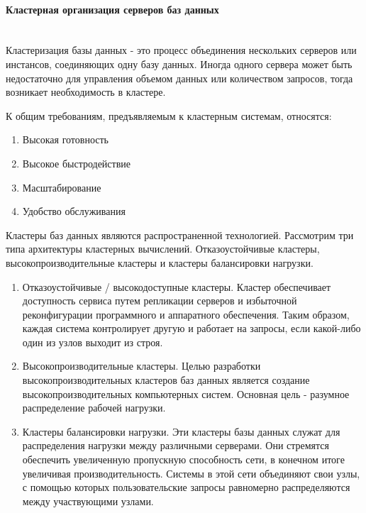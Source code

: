 \paragraph{Кластерная организация серверов баз данных}~\\

Кластеризация базы данных - это процесс объединения нескольких серверов или инстансов, соединяющих одну базу данных. Иногда одного сервера может быть недостаточно для управления объемом данных или количеством запросов, тогда возникает необходимость в кластере. 
 
К общим требованиям, предъявляемым к кластерным системам, относятся:
\begin{enumerate}
    \item Высокая готовность
    \item Высокое быстродействие
    \item Масштабирование
    \item Удобство обслуживания
\end{enumerate}

Кластеры баз данных являются распространенной технологией.  Рассмотрим три типа архитектуры кластерных вычислений. Отказоустойчивые кластеры, высокопроизводительные кластеры и кластеры балансировки нагрузки.

\begin{enumerate}
\item Отказоустойчивые / высокодоступные кластеры. Кластер обеспечивает доступность сервиса путем репликации серверов и избыточной реконфигурации программного и аппаратного обеспечения. Таким образом, каждая система контролирует другую и работает на запросы, если какой-либо один из узлов выходит из строя.

\item Высокопроизводительные кластеры. Целью разработки высокопроизводительных кластеров баз данных является создание высокопроизводительных компьютерных систем. Основная цель - разумное распределение рабочей нагрузки.

\item Кластеры балансировки нагрузки. Эти кластеры базы данных служат для распределения нагрузки между различными серверами. Они стремятся обеспечить увеличенную пропускную способность сети, в конечном итоге увеличивая производительность. Системы в этой сети объединяют свои узлы, с помощью которых пользовательские запросы равномерно распределяются между участвующими узлами.
\end{enumerate}

